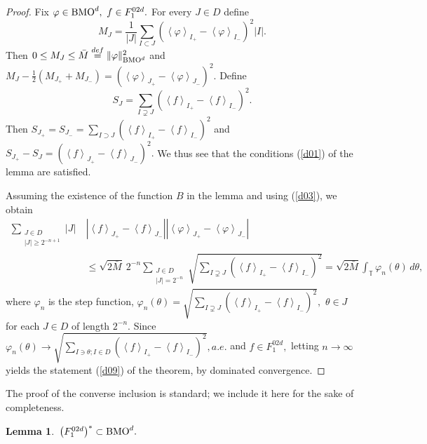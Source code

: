 \documentclass[psamsfonts]{conm-p-l}
\newtheorem{lemma}[theorem]{Lemma}
\theoremstyle{definition}
\theoremstyle{remark}
\numberwithin{equation}{section}
\begin{document}
\begin{proof}Fix $\varphi\in {{\rm{BMO}}}^d,~f\in {F^{02d}_1}.$ For every $J\in D$ define
$$
M_J=\frac1{|J|}\sum_{I\subset J}\left(\left<\varphi\right>_{I_+}-\left<\varphi\right>_{I_-}\right)^2|I|.
$$ 
Then $0\le M_J\le \bar{M}\stackrel{def}{=}\| \varphi \|^2_{{{\rm{BMO}}}^d}$ and
$M_J-\frac12\left(M_{J_+}+M_{J_-}\right)=\left(\left<\varphi\right>_{J_+}-\left<\varphi\right>_{J_-}\right)^2.$
Define 
$$
S_J=\sum_{I\supsetneq J}\left(\left<f\right>_{I_+}-\left<f\right>_{I_-}\right)^2.
$$ 
Then $S_{J_+}=S_{J_-}=\sum_{I\supset J}\left(\left<f\right>_{I_+}-\left<f\right>_{I_-}\right)^2$ and 
$S_{J_+}-S_J=\left(\left<f\right>_{J_+}-\left<f\right>_{J_-}\right)^2.$ We thus see that the conditions (\ref{d01}) of the lemma are satisfied.
\par

Assuming the existence of the function $B$ in the lemma and using (\ref{d03}), we obtain
\begin{align*}
\sum_
{\substack{ 
J\in D\\
|J|\ge2^{{-n+1}} 
}}
\!\!\!\!\!|J|~&|\left<f\right>_{J_+}-\left<f\right>_{J_-}||\left<\varphi\right>_{J_+}-\left<\varphi\right>_{J_-}|\\
&\le
\sqrt{2\bar{M}}~2^{-n}
\!\!\!\!\!\sum_
{\substack{ 
J\in D\\
|J|=2^{{-n}} 
}}
\sqrt{\sum_{I\supsetneq J}\left(\left<f\right>_{I_+}-\left<f\right>_{I_-}\right)^2}
=\sqrt{2\bar{M}}\int_{\mathbb{T}}\varphi_n(\theta)\,d\theta,
\end{align*}
where $\varphi_n$ is the step function, $\varphi_n(\theta)=
\sqrt{\sum_{I\supsetneq J}\left(\left<f\right>_{I_+}-\left<f\right>_{I_-}\right)^2},$ $\theta\in J$ for each $J\in D$ of length $2^{-n}.$ Since $\varphi_n(\theta)\to
\sqrt{\sum_{I\ni \theta;I\in D}\left(\left<f\right>_{I_+}-\left<f\right>_{I_-}\right)^2},a.e.$ and $f\in{F^{02d}_1},$ letting $n\to \infty$ yields the statement (\ref{d09}) of the theorem, by dominated convergence.
\end{proof}
The proof of the converse inclusion is standard; we include it here for the sake of completeness. 
\begin{lemma}
${\displaystyle} \left({F^{02d}_1}\right)^*\subset {{\rm{BMO}}}^d.$
\end{lemma}
\end{document}
